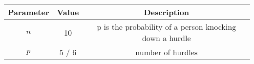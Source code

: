 
\begin{center}
\begin{tabular}{|c|c|c|}
\hline
\textbf{Parameter}& \textbf{Value} & \textbf{Description} \\ \hline
$n$		   	&   10      & p is the probability of a person knocking down a hurdle\\ \hline
$p$ 		&	5 / 6     & number of hurdles\\ \hline
\end{tabular}
\end{center}